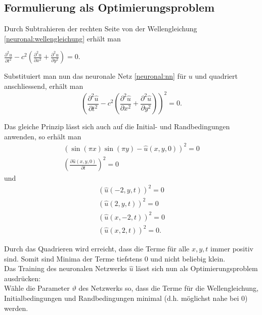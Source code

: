 \subsection{Formulierung als Optimierungsproblem}\label{neuronal:subsection:optimierungsproblem}
Durch Subtrahieren der rechten Seite von der Wellengleichung \eqref{neuronal:wellengleichung} erhält man
\begin{center}
    \( \frac{\partial^2 u}{\partial t^2} - c^2 \left( \frac{\partial^2 u}{\partial x^2} + \frac{\partial^2 u}{\partial y^2} \right) = 0. \)
\end{center}
Substituiert man nun das neuronale Netz \eqref{neuronal:nn} für \( u \) und quadriert anschliessend, erhält man
\begin{equation}
    \left(\frac{\partial^2 \hat{u}}{\partial t^2} - c^2 \left( \frac{\partial^2 \hat{u}}{\partial x^2} + \frac{\partial^2 \hat{u}}{\partial y^2} \right)\right)^2 = 0.
\end{equation}

Das gleiche Prinzip lässt sich auch auf die Initial- und Randbedingungen anwenden, so erhält man
\begin{equation}
    \begin{aligned}
        \left(\sin(\pi x) \sin(\pi y) - \hat{u}(x, y, 0)\right)^2 = 0\\
        \left(\frac{\partial \hat{u}(x, y, 0)}{\partial t}\right)^2 = 0
    \end{aligned}
\end{equation}
und
\begin{equation}
    \begin{aligned}
        \left(\hat{u}(-2, y, t)\right)^2 = 0\\
        \left(\hat{u}(2, y, t)\right)^2 = 0\\
        \left(\hat{u}(x, -2, t)\right)^2 = 0\\
        \left(\hat{u}(x, 2, t)\right)^2 = 0.
    \end{aligned}
\end{equation}

Durch das Quadrieren wird erreicht, dass die Terme für alle \( x, y, t \) immer positiv sind.
Somit sind Minima der Terme tiefstens 0 und nicht beliebig klein.\\

Das Training des neuronalen Netzwerks \( \hat{u} \) lässt sich nun als Optimierungsproblem ausdrücken:\\
Wähle die Parameter \( \vartheta \) des Netzwerks so, dass die Terme für die Wellengleichung, Initialbedingungen und Randbedingungen minimal (d.h. möglichst nahe bei 0) werden.\\

